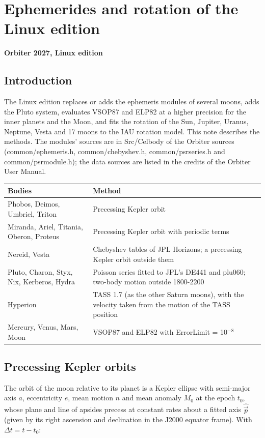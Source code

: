 \documentclass[Orbiter Technical Reference.tex]{subfiles}
\begin{document}
\section{Ephemerides and rotation of the Linux edition}
\textbf{Orbiter 2027, Linux edition}
\begin{sloppypar}


\subsection{Introduction}
The Linux edition replaces or adds the ephemeris modules of several moons, adds the Pluto system, evaluates VSOP87 and ELP82 at a higher precision for the inner planets and the Moon, and fits the rotation of the Sun, Jupiter, Uranus, Neptune, Vesta and 17 moons to the IAU rotation model. This note describes the methods. The modules' sources are in Src/Celbody of the Orbiter sources (common/ephemeris.h, common/chebyshev.h, common/psrseries.h and common/psrmodule.h); the data sources are listed in the credits of the Orbiter User Manual.

	\begin{longtable}{ |p{}|p{}| }
	\hline\rule{0pt}{2ex}
	\textbf{Bodies} & \textbf{Method}\\
	\hline\rule{0pt}{2ex}
	Phobos, Deimos, Umbriel, Triton & Precessing Kepler orbit\\
	\hline\rule{0pt}{2ex}
	Miranda, Ariel, Titania, Oberon, Proteus & Precessing Kepler orbit with periodic terms\\
	\hline\rule{0pt}{2ex}
	Nereid, Vesta & Chebyshev tables of JPL Horizons; a precessing Kepler orbit outside them\\
	\hline\rule{0pt}{2ex}
	Pluto, Charon, Styx, Nix, Kerberos, Hydra & Poisson series fitted to JPL's DE441 and plu060; two-body motion outside 1800-2200\\
	\hline\rule{0pt}{2ex}
	Hyperion & TASS 1.7 (as the other Saturn moons), with the velocity taken from the motion of the TASS position\\
	\hline\rule{0pt}{2ex}
	Mercury, Venus, Mars, Moon & VSOP87 and ELP82 with ErrorLimit = 10$^{-8}$\\
	\hline
	\end{longtable}


\subsection{Precessing Kepler orbits}
The orbit of the moon relative to its planet is a Kepler ellipse with semi-major axis $a$, eccentricity $e$, mean motion $n$ and mean anomaly $M_{0}$ at the epoch $t_{0}$, whose plane and line of apsides precess at constant rates about a fitted axis $\hat{\vec{p}}$ (given by its right ascension and declination in the J2000 equator frame). With $\Delta t = t - t_{0}$:


\end{sloppypar}
\end{document}
